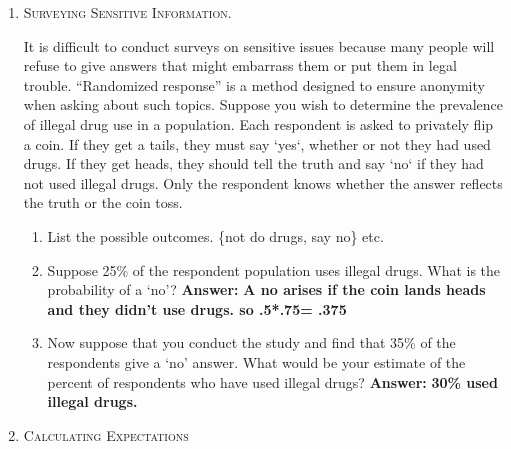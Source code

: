 \documentclass[11pt,letterpaper]{article}
\numberwithin{equation}{section}
\begin{document}
\begin{enumerate}[I]
Suppose that X is a random variable distributed as follows:
$$f(x)=\begin{cases} 0 & \text{for } x< 0\\ 4x & \text{for } 0\leq x < 1/2 \\ 4-4x  & \text{for }  1/2 \leq x\leq 1\\ 0 &\text{for } 1<x
\end{cases}$$
\begin{enumerate}[1)]
\item Draw f(x). \textbf{This looks like a triangle.}
\item Verify that f(x) is a pdf.  \textbf{It needs to integrate to one.}
\item Draw the CDF of X. \textbf{This is a line}
\item What is the probability that $X > .7$?  \textbf{Answer:}  $\int_{.7}^1 4-4x dx= 4x-2x^2|_{.7}^1= 2-1.82=.18$
\end{enumerate}
\item \textsc{Surveying Sensitive Information.}

It is difficult to conduct surveys on sensitive issues because many people will refuse to give answers that might embarrass them or put them in legal trouble. ``Randomized response'' is a method designed to ensure anonymity when asking about such topics. Suppose you wish to determine the prevalence of illegal drug use in a population.  Each respondent is asked to privately flip a coin. If they get a tails, they must say `yes`, whether or not they had used drugs.  If they get heads, they should tell the truth and say `no` if they had not used illegal drugs.  Only the respondent knows whether the answer reflects the truth or the coin toss.

\begin{enumerate}[1)]
\item List the possible outcomes. \{not do drugs, say no\} etc.
\item Suppose 25\% of the respondent population uses illegal drugs. What is the probability of a `no'?  \textbf{Answer:} \textbf{A no arises if the coin lands heads and they didn't use drugs.  so .5*.75= .375}
\item  Now suppose that you conduct the study and find that 35\% of the respondents give a `no' answer. What would be your estimate of the percent of respondents who have used illegal drugs?   \textbf{Answer:} \textbf{30\% used illegal drugs.} 
\end{enumerate}
\pagebreak
\item \textsc{Calculating Expectations}
\begin{enumerate}[1)]


\end{enumerate}
\end{enumerate}
\end{document}
